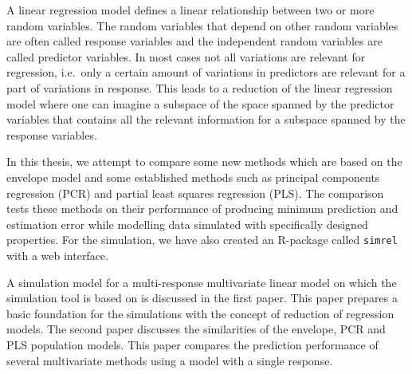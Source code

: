 A linear regression model defines a linear relationship between two or
more random variables. The random variables that depend on other random
variables are often called response variables and the independent random
variables are called predictor variables. In most cases not all
variations are relevant for regression, i.e.~only a certain amount of
variations in predictors are relevant for a part of variations in
response. This leads to a reduction of the linear regression model where
one can imagine a subspace of the space spanned by the predictor
variables that contains all the relevant information for a subspace
spanned by the response variables.

In this thesis, we attempt to compare some new methods which are based
on the envelope model and some established methods such as principal
components regression (PCR) and partial least squares regression (PLS).
The comparison tests these methods on their performance of producing
minimum prediction and estimation error while modelling data simulated
with specifically designed properties. For the simulation, we have also
created an R-package called \texttt{simrel} with a web interface.

A simulation model for a multi-response multivariate linear model on
which the simulation tool is based on is discussed in the first paper.
This paper prepares a basic foundation for the simulations with the
concept of reduction of regression models. The second paper discusses
the similarities of the envelope, PCR and PLS population models. This
paper compares the prediction performance of several multivariate
methods using a model with a single response.
